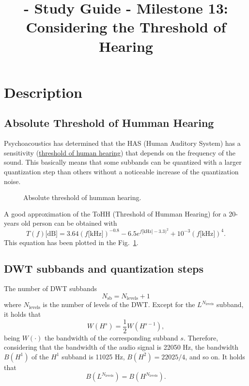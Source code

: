 
\title{\TM{} - Study Guide - Milestone 13: Considering the Threshold of Hearing}

\maketitle

\section{Description}

\subsection{Absolute Threshold of Humman Hearing}
Psychoacoustics has determined that the HAS (Human Auditory System) has a
sensitivity
(\href{https://en.wikipedia.org/wiki/Absolute_threshold_of_hearing}{threshold
  of human hearing}) that depends on the frequency of the sound. This
basically means that some subbands can be quantized with a larger
quantization step than others without a noticeable increase of the
quantization noise.

\begin{figure}
  \centering
  \caption{Absolute threshold of humman hearing.}
  \label{fig:ToHH}
\end{figure}

A good approximation of the ToHH (Threshold of Humman Hearing) for a 20-years old person can be
obtained with~\cite{bosi2003intro}
\begin{equation}
  T(f)\text{[dB]} = 3.64(f\text{[kHz]})^{-0.8} - 6.5e^{f\text{[kHz]}-3.3)^2} + 10^{-3}(f\text{[kHz]})^4.
  \label{eq:ToHH}
\end{equation}
This equation has been plotted in the Fig.~\ref{fig:ToHH}.

\subsection{DWT subbands and quantization steps}
The number of DWT subbands
\begin{equation}
  N_{\text{sb}} = N_{\text{levels}} + 1
\end{equation}
where $N_{\text{levels}}$ is the number of levels of the DWT. Except for
the $L^{N_{\text{levels}}}$ subband, it holds that
\begin{equation}
  W(H^s) = \frac{1}{2}W(H^{s-1}),
\end{equation}
being $W(\cdot)$ the bandwidth of the corresponding
subband $s$. Therefore, considering that the bandwidth of the audio signal
is 22050 Hz, the bandwidth $B(H^1)$ of the $H^1$ subband is 11025 Hz,
$B(H^2)=22025/4$, and so on. It holds that
\begin{equation}
  B(L^{N_{\text{levels}}}) = B(H^{N_{\text{levels}}}).
\end{equation}

